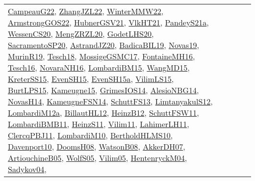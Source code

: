 {\begin{longtable}{lp{3cm}>{\raggedright}p{6cm}>{\raggedright}p{6cm}p{8cm}}
\href{articles/CampeauG22.pdf}{CampeauG22}\cite{CampeauG22}, \href{papers/ZhangJZL22.pdf}{ZhangJZL22}\cite{ZhangJZL22}, \href{papers/WinterMMW22.pdf}{WinterMMW22}\cite{WinterMMW22}, \href{papers/ArmstrongGOS22.pdf}{ArmstrongGOS22}\cite{ArmstrongGOS22}, \href{articles/HubnerGSV21.pdf}{HubnerGSV21}\cite{HubnerGSV21}, \href{articles/VlkHT21.pdf}{VlkHT21}\cite{VlkHT21}, \href{articles/PandeyS21a.pdf}{PandeyS21a}\cite{PandeyS21a}, \href{papers/WessenCS20.pdf}{WessenCS20}\cite{WessenCS20}, \href{articles/MengZRZL20.pdf}{MengZRZL20}\cite{MengZRZL20}, \href{papers/GodetLHS20.pdf}{GodetLHS20}\cite{GodetLHS20}, \href{articles/SacramentoSP20.pdf}{SacramentoSP20}\cite{SacramentoSP20}, \href{articles/AstrandJZ20.pdf}{AstrandJZ20}\cite{AstrandJZ20}, \href{papers/BadicaBIL19.pdf}{BadicaBIL19}\cite{BadicaBIL19}, \href{articles/Novas19.pdf}{Novas19}\cite{Novas19}, \href{papers/MurinR19.pdf}{MurinR19}\cite{MurinR19}, \href{papers/Tesch18.pdf}{Tesch18}\cite{Tesch18}, \href{papers/MossigeGSMC17.pdf}{MossigeGSMC17}\cite{MossigeGSMC17}, \href{papers/FontaineMH16.pdf}{FontaineMH16}\cite{FontaineMH16}, \href{papers/Tesch16.pdf}{Tesch16}\cite{Tesch16}, \href{articles/NovaraNH16.pdf}{NovaraNH16}\cite{NovaraNH16}, \href{papers/LombardiBM15.pdf}{LombardiBM15}\cite{LombardiBM15}, \href{articles/WangMD15.pdf}{WangMD15}\cite{WangMD15}, \href{papers/KreterSS15.pdf}{KreterSS15}\cite{KreterSS15}, \href{papers/EvenSH15.pdf}{EvenSH15}\cite{EvenSH15}, \href{articles/EvenSH15a.pdf}{EvenSH15a}\cite{EvenSH15a}, \href{papers/VilimLS15.pdf}{VilimLS15}\cite{VilimLS15}, \href{papers/BurtLPS15.pdf}{BurtLPS15}\cite{BurtLPS15}, \href{articles/Kameugne15.pdf}{Kameugne15}\cite{Kameugne15}, \href{articles/GrimesIOS14.pdf}{GrimesIOS14}\cite{GrimesIOS14}, \href{papers/AlesioNBG14.pdf}{AlesioNBG14}\cite{AlesioNBG14}, \href{articles/NovasH14.pdf}{NovasH14}\cite{NovasH14}, \href{articles/KameugneFSN14.pdf}{KameugneFSN14}\cite{KameugneFSN14}, \href{papers/SchuttFS13.pdf}{SchuttFS13}\cite{SchuttFS13}, \href{articles/LimtanyakulS12.pdf}{LimtanyakulS12}\cite{LimtanyakulS12}, \href{articles/LombardiM12a.pdf}{LombardiM12a}\cite{LombardiM12a}, \href{papers/BillautHL12.pdf}{BillautHL12}\cite{BillautHL12}, \href{papers/HeinzB12.pdf}{HeinzB12}\cite{HeinzB12}, \href{articles/SchuttFSW11.pdf}{SchuttFSW11}\cite{SchuttFSW11}, \href{papers/LombardiBMB11.pdf}{LombardiBMB11}\cite{LombardiBMB11}, \href{papers/HeinzS11.pdf}{HeinzS11}\cite{HeinzS11}, \href{papers/Vilim11.pdf}{Vilim11}\cite{Vilim11}, \href{papers/LahimerLH11.pdf}{LahimerLH11}\cite{LahimerLH11}, \href{papers/ClercqPBJ11.pdf}{ClercqPBJ11}\cite{ClercqPBJ11}, \href{papers/LombardiM10.pdf}{LombardiM10}\cite{LombardiM10}, \href{papers/BertholdHLMS10.pdf}{BertholdHLMS10}\cite{BertholdHLMS10}, \href{papers/Davenport10.pdf}{Davenport10}\cite{Davenport10}, \href{papers/DoomsH08.pdf}{DoomsH08}\cite{DoomsH08}, \href{papers/WatsonB08.pdf}{WatsonB08}\cite{WatsonB08}, \href{papers/AkkerDH07.pdf}{AkkerDH07}\cite{AkkerDH07}, \href{papers/ArtiouchineB05.pdf}{ArtiouchineB05}\cite{ArtiouchineB05}, \href{papers/WolfS05.pdf}{WolfS05}\cite{WolfS05}, \href{papers/Vilim05.pdf}{Vilim05}\cite{Vilim05}, \href{papers/HentenryckM04.pdf}{HentenryckM04}\cite{HentenryckM04}, \href{papers/Sadykov04.pdf}{Sadykov04}\cite{Sadykov04}, 
\end{longtable}}
